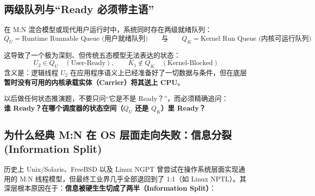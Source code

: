\documentclass[11pt,a4paper]{ctexart}
\newcommand{\kw}[1]{\textbf{#1}}
\begin{document}
\subsection{两级队列与“Ready 必须带主语”}

在 M:N 混合模型或现代用户运行时中，系统同时存在两级就绪队列：
\[
\boxed{
Q_U = \text{Runtime Runnable Queue (用户就绪队列)}
\qquad\text{与}\qquad
Q_K = \text{Kernel Run Queue (内核可运行队列)}
}
\]

这导致了一个极为深刻、但传统五态模型无法表达的状态：
\[
\boxed{
U_2 \in Q_U \quad (\text{User-Ready}),
\qquad
K_1 \notin Q_K \quad (\text{Kernel-Blocked})
}
\]
含义是：逻辑线程 $U_2$ 在应用程序语义上已经准备好了一切数据与条件，但在底层\kw{暂时没有可用的内核承载实体（Carrier）将其送上 CPU}。

\begin{corebox}[状态判据铁律]
以后做任何状态推演题，不要只问“它是不是 Ready？”，而必须精确追问：\\
\kw{谁 Ready？在哪个调度器的状态空间（$Q_U$ 还是 $Q_K$）里 Ready？}
\end{corebox}

\subsection{为什么经典 M:N 在 OS 层面走向失败：信息分裂 (Information Split)}

历史上 Unix/Solaris、FreeBSD 以及 Linux NGPT 曾尝试在操作系统层面实现通用的 M:N 线程模型，但最终工业界几乎全部退回到了 1:1（如 Linux NPTL）。其深层根本原因在于：\kw{信息被硬生生切成了两半（Information Split）}：
\end{document}

